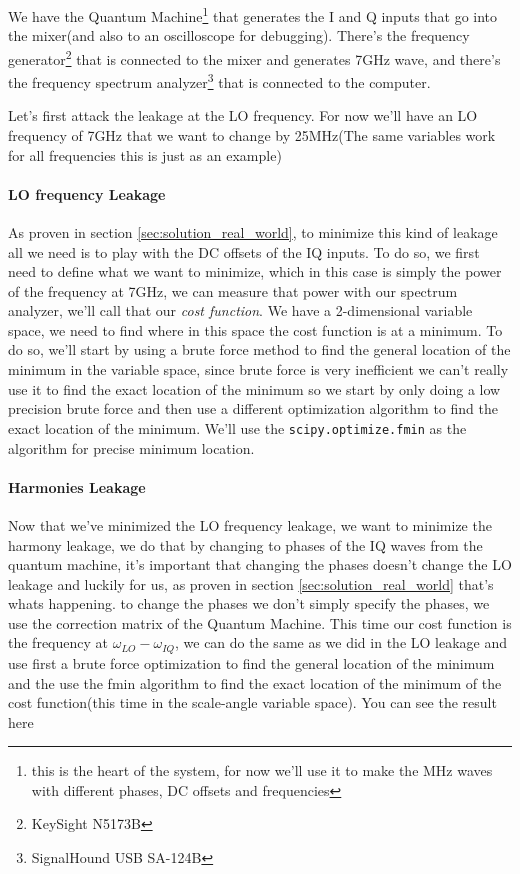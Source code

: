 \documentclass[english, a4paper, 12pt, twoside]{article}
\numberwithin{equation}{section} %
\begin{document}
We have the Quantum Machine\footnote{this is the heart of the system, for now we'll use it to make the MHz waves with different phases, DC offsets and frequencies} that generates the I and Q inputs that go into the mixer(and also to an oscilloscope for debugging). There's the frequency generator\footnote{KeySight N5173B} that is connected to the mixer and generates 7GHz wave, and there's the frequency spectrum analyzer\footnote{SignalHound USB SA-124B} that is connected to the computer.

Let's first attack the leakage at the LO frequency. For now we'll have an LO frequency of 7GHz that we want to change by 25MHz(The same variables work for all frequencies this is just as an example)

\paragraph{LO frequency Leakage}
As proven in section \ref{sec:solution_real_world}, to minimize this kind of leakage all we need is to play with the DC offsets of the IQ inputs. To do so, we first need to define what we want to minimize, which in this case is simply the power of the frequency at 7GHz, we can measure that power with our spectrum analyzer, we'll call that our \textit{cost function}.
We have a 2-dimensional variable space, we need to find where in this space the cost function is at a minimum. To do so, we'll start by using a brute force method to find the general location of the minimum in the variable space, since brute force is very inefficient we can't really use it to find the exact location of the minimum so we start by only doing a low precision brute force and then use a different optimization algorithm to find the exact location of the minimum. We'll use the \texttt{scipy.optimize.fmin} as the algorithm for precise minimum location.%

\paragraph{Harmonies Leakage}
Now that we've minimized the LO frequency leakage, we want to minimize the harmony leakage, we do that by changing to phases of the IQ waves from the quantum machine, it's important that changing the phases doesn't change the LO leakage and luckily for us, as proven in section \ref{sec:solution_real_world} that's whats happening. to change the phases we don't simply specify the phases, we use the correction matrix of the Quantum Machine. %
This time our cost function is the frequency at $\omega_{LO} - \omega_{IQ}$, we can do the same as we did in the LO leakage and use first a brute force optimization to find the general location of the minimum and the use the fmin algorithm to find the exact location of the minimum of the cost function(this time in the scale-angle variable space). You can see the result here
\end{document}
